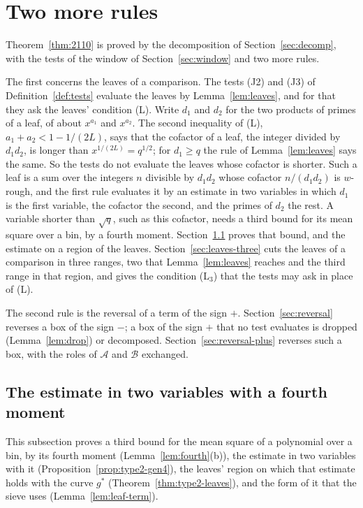 \documentclass[11pt]{article}
\theoremstyle{definition}
\begin{document}
\section{Two more rules}\label{sec:rules}

Theorem~\ref{thm:2110} is proved by the decomposition of Section~\ref{sec:decomp}, with the tests of the window of
Section~\ref{sec:window} and two more rules.

The first concerns the leaves of a comparison. The tests (J2) and (J3) of Definition~\ref{def:tests} evaluate the
leaves by Lemma~\ref{lem:leaves}, and for that they ask the leaves' condition (L). Write $d_1$ and $d_2$ for the two
products of primes of a leaf, of about $x^{a_1}$ and $x^{a_2}$. The second inequality of (L), $a_1 + a_2 < 1 -
1/(2L)$, says that the cofactor of a leaf, the integer divided by $d_1 d_2$, is longer than $x^{1/(2L)} = q^{1/2}$;
for $d_1 \ge q$ the rule of Lemma~\ref{lem:leaves} says the same. So the tests do not evaluate the leaves whose
cofactor is shorter. Such a leaf is a sum over the integers $n$ divisible by $d_1 d_2$ whose cofactor $n/(d_1 d_2)$ is
$w$-rough, and the first rule evaluates it by an estimate in two variables in which $d_1$ is the first variable, the
cofactor the second, and the primes of $d_2$ the rest. A variable shorter than $\sqrt q$, such as this cofactor, needs
a third bound for its mean square over a bin, by a fourth moment. Section~\ref{sec:leaf-estimate} proves that bound,
and the estimate on a region of the leaves. Section~\ref{sec:leaves-three} cuts the leaves of a comparison in three
ranges, two that Lemma~\ref{lem:leaves} reaches and the third range in that region, and gives the condition (L$_3$)
that the tests may ask in place of (L).

The second rule is the reversal of a term of the sign $+$. Section~\ref{sec:reversal} reverses a box of the sign $-$; a
box of the sign $+$ that no test evaluates is dropped (Lemma~\ref{lem:drop}) or decomposed.
Section~\ref{sec:reversal-plus} reverses such a box, with the roles of $\mathcal A$ and $\mathcal B$ exchanged.

\subsection{The estimate in two variables with a fourth moment}\label{sec:leaf-estimate}

This subsection proves a third bound for the mean square of a polynomial over a bin, by its fourth moment
(Lemma~\ref{lem:fourth}(b)), the estimate in two variables with it (Proposition~\ref{prop:type2-gen4}), the leaves'
region on which that estimate holds with the curve $g^*$ (Theorem~\ref{thm:type2-leaves}), and the form of it that the
sieve uses (Lemma~\ref{lem:leaf-term}).
\end{document}
